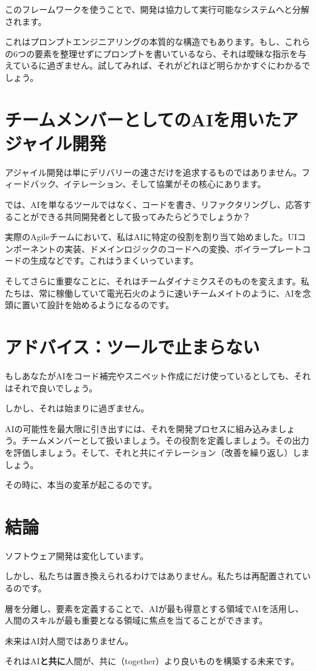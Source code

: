 \documentclass{article}
\begin{document}
このフレームワークを使うことで、開発は協力して実行可能なシステムへと分解されます。

これはプロンプトエンジニアリングの本質的な構造でもあります。もし、これらの6つの要素を整理せずにプロンプトを書いているなら、それは曖昧な指示を与えているに過ぎません。試してみれば、それがどれほど明らかかすぐにわかるでしょう。

\section{チームメンバーとしてのAIを用いたアジャイル開発}

アジャイル開発は単にデリバリーの速さだけを追求するものではありません。フィードバック、イテレーション、そして協業がその核心にあります。

では、AIを単なるツールではなく、コードを書き、リファクタリングし、応答することができる共同開発者として扱ってみたらどうでしょうか？

実際のAgileチームにおいて、私はAIに特定の役割を割り当て始めました。UIコンポーネントの実装、ドメインロジックのコードへの変換、ボイラープレートコードの生成などです。これはうまくいっています。

そしてさらに重要なことに、それはチームダイナミクスそのものを変えます。私たちは、常に稼働していて電光石火のように速いチームメイトのように、AIを念頭に置いて設計を始めるようになるのです。

\section{アドバイス：ツールで止まらない}

もしあなたがAIをコード補完やスニペット作成にだけ使っているとしても、それはそれで良いでしょう。

しかし、それは始まりに過ぎません。

AIの可能性を最大限に引き出すには、それを開発プロセスに組み込みましょう。チームメンバーとして扱いましょう。その役割を定義しましょう。その出力を評価しましょう。そして、それと共にイテレーション（改善を繰り返し）しましょう。

その時に、本当の変革が起こるのです。

\section{結論}

ソフトウェア開発は変化しています。

しかし、私たちは置き換えられるわけではありません。私たちは再配置されているのです。

層を分離し、要素を定義することで、AIが最も得意とする領域でAIを活用し、人間のスキルが最も重要となる領域に焦点を当てることができます。

未来はAI対人間ではありません。

それはAI\textbf{と共に}人間が、共に（together）より良いものを構築する未来です。
\end{document}
